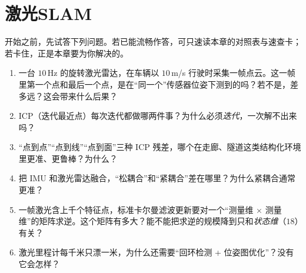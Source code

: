 \chapter{激光SLAM}
\label{ch:lidar_slam}


\begin{practice}[前置自测]
开始之前，先试答下列问题。若已能流畅作答，可只速读本章的对照表与速查卡；若卡住，正是本章要为你解决的。
\begin{enumerate}
  \item 一台 $10$\,Hz 的旋转激光雷达，在车辆以 $10$\,m/s 行驶时采集一帧点云。这一帧里第一个点和最后一个点，是在“同一个”传感器位姿下测到的吗？若不是，差多远？这会带来什么后果？
  \item ICP（迭代最近点）每次迭代都做哪两件事？为什么必须\emph{迭代}，一次解不出来吗？
  \item “点到点”“点到线”“点到面”三种 ICP 残差，哪个在走廊、隧道这类结构化环境里更准、更鲁棒？为什么？
  \item 把 IMU 和激光雷达融合，“松耦合”和“紧耦合”差在哪里？为什么紧耦合通常更准？
  \item 一帧激光含上千个特征点，标准卡尔曼滤波更新要对一个“测量维 $\times$ 测量维”的矩阵求逆。这个矩阵有多大？能不能把求逆的规模降到只和\emph{状态维}（$18$）有关？
  \item 激光里程计每千米只漂一米，为什么还需要“回环检测 + 位姿图优化”？没有它会怎样？
\end{enumerate}
\end{practice}


